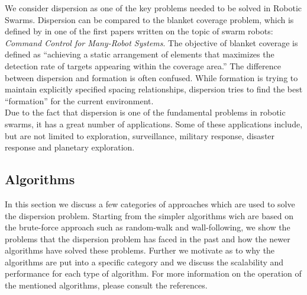 We consider dispersion as one of the key problems needed to be solved in Robotic Swarms.\cite{ugur2007dispersion,mclurkin2007distributed,ludwig2006robotic} Dispersion can be compared to the blanket coverage problem, which is defined by in one of the first papers written on the topic of swarm robots: \emph{Command Control for Many-Robot Systems}.\cite{gage1992command} The objective of blanket coverage is defined as ``achieving a static arrangement of elements that maximizes the detection rate of targets appearing within the coverage area.''\cite{gage1992command} The difference between dispersion and formation is often confused. While formation is trying to maintain explicitly specified spacing relationships, dispersion tries to find the best ``formation'' for the current environment. \\

Due to the fact that dispersion is one of the fundamental problems in robotic swarms, it has a great number of applications.
Some of these applications include, but are not limited to exploration, surveillance, military response, disaster response and planetary exploration.\cite{ludwig2006robotic,Penders2011,mclurkin2007distributed} 

\subsection{Algorithms}
In this section we discuss a few categories of approaches which are used to solve the dispersion problem.
Starting from the simpler algorithms wich are based on the brute-force approach such as random-walk and wall-following, we show the problems that the dispersion problem has faced in the past and how the newer algorithms have solved these problems.
Further we motivate as to why the algorithms are put into a specific category and we discuss the scalability and performance for each type of algorithm.
For more information on the operation of the mentioned algorithms, please consult the references.

